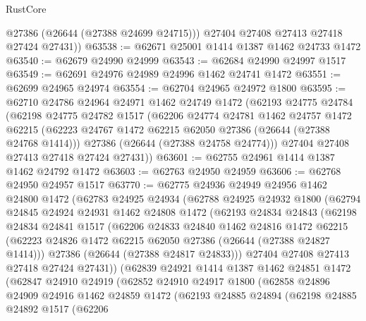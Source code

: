 \begin{lexlean}{RustCore}
\begin{coremodule}
          @27386
          (@26644 (@27388 @24699 @24715)))
        @27404
        @27408
        @27413
        @27418
        @27424
        @27431))
@63538 := @62671 @25001 @1414 @1387 @1462 @24733 @1472
@63540 := @62679 @24990 @24999
@63543 := @62684 @24990 @24997 @1517
@63549 := @62691 @24976 @24989 @24996 @1462 @24741 @1472
@63551 := @62699 @24965 @24974
@63554 := @62704 @24965 @24972 @1800
@63595 := @62710
    @24786
    @24964
    @24971
    @1462
    @24749
    @1472
    (@62193
      @24775
      @24784
      (@62198
        @24775
        @24782
        @1517
        (@62206
          @24774
          @24781
          @1462
          @24757
          @1472
          @62215
          (@62223 @24767 @1472 @62215 @62050 @27386 (@26644 (@27388 @24768 @1414)))
          @27386
          (@26644 (@27388 @24758 @24774)))
        @27404
        @27408
        @27413
        @27418
        @27424
        @27431))
@63601 := @62755 @24961 @1414 @1387 @1462 @24792 @1472
@63603 := @62763 @24950 @24959
@63606 := @62768 @24950 @24957 @1517
@63770 := @62775
    @24936
    @24949
    @24956
    @1462
    @24800
    @1472
    (@62783
      @24925
      @24934
      (@62788
        @24925
        @24932
        @1800
        (@62794
          @24845
          @24924
          @24931
          @1462
          @24808
          @1472
          (@62193
            @24834
            @24843
            (@62198
              @24834
              @24841
              @1517
              (@62206
                @24833
                @24840
                @1462
                @24816
                @1472
                @62215
                (@62223 @24826 @1472 @62215 @62050 @27386 (@26644 (@27388 @24827 @1414)))
                @27386
                (@26644 (@27388 @24817 @24833)))
              @27404
              @27408
              @27413
              @27418
              @27424
              @27431))
          (@62839
            @24921
            @1414
            @1387
            @1462
            @24851
            @1472
            (@62847
              @24910
              @24919
              (@62852
                @24910
                @24917
                @1800
                (@62858
                  @24896
                  @24909
                  @24916
                  @1462
                  @24859
                  @1472
                  (@62193
                    @24885
                    @24894
                    (@62198
                      @24885
                      @24892
                      @1517
                      (@62206

\end{coremodule}
\end{lexlean}
